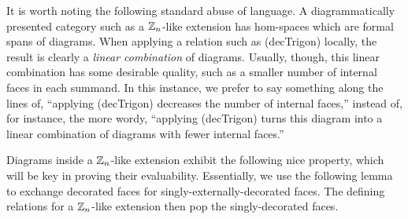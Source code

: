 \begin{remark}
    It is worth noting the following standard abuse of language. 
    A diagrammatically presented category such as a $\mathbb{Z}_n$-like extension has hom-spaces which are formal spans of diagrams.
    When applying a relation such as (decTrigon) locally, the result is clearly a {\it linear combination} of diagrams.
    Usually, though, this linear combination has some desirable quality, such as a smaller number of internal faces in each summand.
    In this instance, we prefer to say something along the lines of, 
    ``applying (decTrigon) decreases the number of internal faces,''
    instead of, for instance, the more wordy,
    ``applying (decTrigon) turns this diagram into a linear combination of diagrams with fewer internal faces.''
\end{remark}






Diagrams inside a $\mathbb{Z}_n$-like extension exhibit the following nice property, which will be key in proving their evaluability.
Essentially, we use the following lemma to exchange decorated faces for singly-externally-decorated faces.
The defining relations for a $\mathbb{Z}_n$-like extension then pop the singly-decorated faces.

